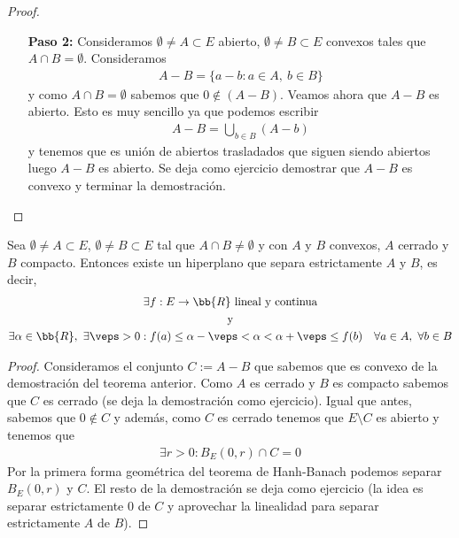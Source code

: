 \begin{teo}
\begin{proof}
\begin{itemize}
            \item[\textbf{Paso 2:}] Consideramos $\emptyset\neq A \subset E$ abierto, $\emptyset\neq B\subset E$ convexos tales que $A\cap B=\emptyset$. Consideramos 
            \begin{gather*}
                A-B = \{a-b : a\in A,\ b\in B\}
            \end{gather*}
            y como $A\cap B=\emptyset$ sabemos que $0\notin (A-B)$. Veamos ahora que $A-B$ es abierto. Esto es muy sencillo ya que podemos escribir
            \begin{gather*}
                A-B = \bigcup\limits_{b\in B}(A-b)
            \end{gather*}
            y tenemos que es unión de abiertos trasladados que siguen siendo abiertos luego $A-B$ es abierto.
            Se deja como ejercicio demostrar que $A-B$ es convexo y terminar la demostración.
        \end{itemize}
    \end{proof}
\end{teo}

\begin{teo}
    Sea $\emptyset\neq A \subset E$, $\emptyset \neq B \subset E$ tal que $A\cap B\neq \emptyset$  y con $A$ y $B$ convexos, $A$ cerrado y $B$ compacto. Entonces existe un hiperplano que separa estrictamente $A$ y $B$, es decir,
    \begin{gather*}
        \exists f :E \to \bb{R} \text{ lineal y continua}\\
        \text{ y }\\
        \exists \alpha \in \bb{R}, \ \exists \veps >0 : f(a) \leq \alpha - \veps < \alpha < \alpha + \veps \leq f(b) \ \ \ \forall a \in A,\ \forall b \in B
    \end{gather*}

    \begin{proof}
        Consideramos el conjunto $C:=A-B$ que sabemos que es convexo de la demostración del teorema anterior. Como $A$ es cerrado y $B$ es compacto sabemos que $C$ es cerrado (se deja la demostración como ejercicio). Igual que antes, sabemos que $0\notin C$ y además, como $C$ es cerrado tenemos que $E\setminus C$ es abierto y tenemos que 
        \begin{gather*}
            \exists r >0: B_E(0,r)\cap C =0
        \end{gather*}
        Por la primera forma geométrica del teorema de Hanh-Banach podemos separar $B_E(0,r)$ y $C$. El resto de la demostración se deja como ejercicio (la idea es separar estrictamente $0$ de $C$ y aprovechar la linealidad para separar estrictamente $A$ de $B$).
    \end{proof}
\end{teo}


